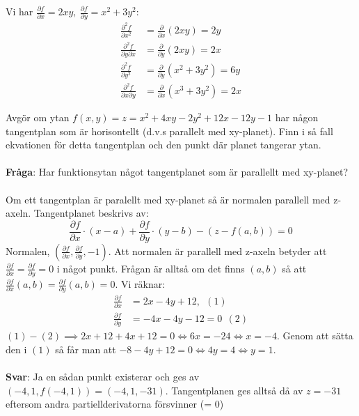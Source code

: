 \documentclass{report}
\begin{document}
\pagebreak
\ex{}
{
Vi har $ \frac{\partial f}{\partial x} = 2xy, \: \frac{\partial f}{\partial y} = x^2+3y^2 $:
\begin{align*}
	\frac{\partial^2 f}{\partial x^2} &= \frac{\partial}{\partial x}(2xy) = 2y\\
	\frac{\partial^2 f}{\partial y \partial x} &= \frac{\partial}{\partial y}(2xy) = 2x\\
	\frac{\partial^2 f}{\partial y^2} &= \frac{\partial}{\partial y}(x^2+3y^2) = 6y\\
	\frac{\partial^2 f}{\partial x \partial y} &= \frac{\partial}{\partial x}(x^3+3y^2) = 2x
\end{align*}
}

\ex{}
{
Avgör om ytan $ f(x,y) = z = x^2+4xy-2y^2+12x-12y-1 $ har någon tangentplan som är horisontellt (d.v.s parallelt med xy-planet). Finn i så fall ekvationen för detta tangentplan och den punkt där planet tangerar ytan.\\\\

\textbf{Fråga}: Har funktionsytan något tangentplanet som är parallellt med xy-planet?\\\\

Om ett tangentplan är paralellt med xy-planet så är normalen parallell med z-axeln. Tangentplanet beskrivs av:
\begin{equation*}
\frac{\partial f}{\partial x} \cdot (x-a) + \frac{\partial f}{\partial y} \cdot (y-b) - (z-f(a,b)) = 0
\end{equation*}
Normalen, $ ( \frac{\partial f}{\partial x}, \frac{\partial f}{\partial y}, -1  ) $. Att normalen är parallell med z-axeln betyder att $ \frac{\partial f}{\partial x} = \frac{\partial f}{\partial y} = 0$ i något punkt. Frågan är alltså om det finns $ (a,b) $ så att $ \frac{\partial f}{\partial x}(a,b) = \frac{\partial f}{\partial y}(a,b) = 0 $. Vi räknar:
\begin{align*}
	\frac{\partial f}{\partial x} &= 2x-4y+12, \:\: (1)\\ 
	\frac{\partial f}{\partial y} &= -4x-4y-12 = 0 \:\: (2)
\end{align*}
$ (1)-(2) \implies 2x+12+4x+12 = 0 \iff 6x = -24 \iff x = -4 $. Genom att sätta den i $ (1) $ så får man att $ -8 -4y + 12 = 0 \iff 4y = 4 \iff y = 1 $.\\\\

\textbf{Svar}: Ja en sådan punkt existerar och ges av $ (-4,1,f(-4,1)) = (-4,1,-31) $. Tangentplanen ges alltså då av $ z = -31 $ eftersom andra partiellderivatorna försvinner (= 0) 
}
\end{document}

